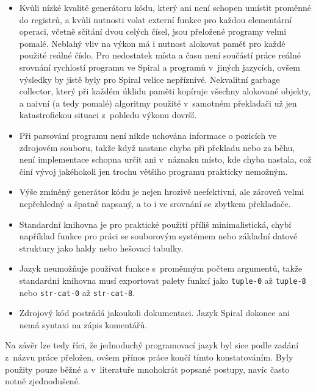 \begin{itemize}
  \item Kvůli nízké kvalitě generátoru kódu, který ani není schopen umístit
    proměnné do registrů, a kvůli nutnosti volat externí funkce pro každou
    elementární operaci, včetně sčítání dvou celých čísel, jsou přeložené programy
    velmi pomalé. Neblahý vliv na výkon má i nutnost alokovat paměť pro každé
    použité reálné číslo. Pro nedostatek místa a času není součástí práce reálné
    srovnání rychlostí programu ve Spiral a programů v~jiných jazycích, ovšem
    výsledky by jistě byly pro Spiral velice nepříznivé. Nekvalitní garbage
    collector, který při každém úklidu paměti kopíruje všechny alokované
    objekty, a naivní (a tedy pomalé) algoritmy použité v~samotném překladači už
    jen katastrofickou situaci z~pohledu výkonu dovrší.

  \item Při parsování programu není nikde uchována informace o pozicích ve
    zdrojovém souboru, takže když nastane chyba při překladu nebo za běhu, není
    implementace schopna určit ani v~náznaku místo, kde chyba nastala, což činí
    vývoj jakéhokoli jen trochu většiho programu prakticky nemožným.

  \item Výše zmíněný generátor kódu je nejen hrozivě neefektivní, ale zároveň
    velmi nepřehledný a špatně napsaný, a to i ve srovnání se zbytkem
    překladače.

  \item Standardní knihovna je pro praktické použití příliš minimalistická,
    chybí například funkce pro práci se souborovým systémem nebo základní datové
    struktury jako haldy nebo hešovací tabulky.

  \item Jazyk neumožňuje používat funkce s~proměnným počtem argumentů, takže
    standardní knihovna musí exportovat palety funkcí jako \texttt{tuple-0} až
    \texttt{tuple-8} nebo \texttt{str-cat-0} až \texttt{str-cat-8}.

  \item Zdrojový kód postrádá jakoukoli dokumentaci. Jazyk Spiral dokonce ani
    nemá syntaxi na zápis komentářů.
\end{itemize}

Na závěr lze tedy říci, že jednoduchý programovací jazyk byl sice podle zadání
z~názvu práce přeložen, ovšem přínos práce končí tímto konstatováním. Byly
použity pouze běžné a v~literatuře mnohokrát popsané postupy, navíc často notně
zjednodušené.
